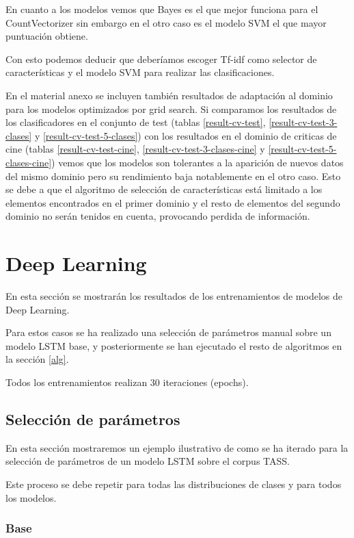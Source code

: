 En cuanto a los modelos vemos que Bayes es el que mejor funciona para el CountVectorizer sin embargo en el otro caso es el modelo SVM el que mayor puntuación obtiene.

Con esto podemos deducir que deberíamos escoger Tf-idf como selector de características y el modelo SVM para realizar las clasificaciones.

En el material anexo se incluyen también resultados de adaptación al dominio para los modelos optimizados por grid search. Si comparamos los resultados de los clasificadores en el conjunto de test (tablas \ref{result-cv-test}, \ref{result-cv-test-3-clases} y \ref{result-cv-test-5-clases}) con los resultados en el dominio de criticas de cine (tablas \ref{result-cv-test-cine}, \ref{result-cv-test-3-clases-cine} y \ref{result-cv-test-5-clases-cine}) vemos que los modelos son tolerantes a la aparición de nuevos datos del mismo dominio pero su rendimiento baja notablemente en el otro caso. Esto se debe a que el algoritmo de selección de características está limitado a los elementos encontrados en el primer dominio y el resto de elementos del segundo dominio no serán tenidos en cuenta, provocando perdida de información.


\section{Deep Learning}

En esta sección se mostrarán los resultados de los entrenamientos de modelos de Deep Learning.

Para estos casos se ha realizado una selección de parámetros manual sobre un modelo LSTM base, y posteriormente se han ejecutado el resto de algoritmos en la sección \ref{alg}. 

Todos los entrenamientos realizan 30 iteraciones (epochs).

\subsection{Selección de parámetros}

En esta sección mostraremos un ejemplo ilustrativo de como se ha iterado para la selección de parámetros de un modelo LSTM sobre el corpus TASS.

Este proceso se debe repetir para todas las distribuciones de clases y para todos los modelos.

\subsubsection{Base}

